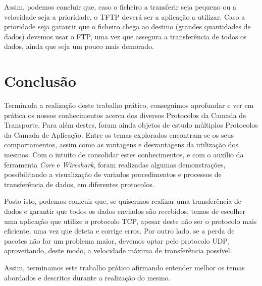 \documentclass[11pt]{article}
\begin{document}
Assim, podemos concluir que, caso o ficheiro a transferir seja pequeno ou a velocidade seja a prioridade, o TFTP deverá ser a aplicação a utilizar. Caso a prioridade seja garantir que o ficheiro chega ao destino (grandes quantidades de dados) devemos usar o FTP, uma vez que assegura a transferência de todos os dados, ainda que seja um pouco mais demorado.


\clearpage
\section{Conclusão}

Terminada a realização deste trabalho prático, conseguimos aprofundar e ver em prática os nossos conhecimentos acerca dos diversos Protocolos da Camada de Transporte. Para além destes, foram ainda objetos de estudo múltiplos Protocolos da Camada de Aplicação. Entre os temas explorados encontram-se os seus comportamentos, assim como as vantagens e desvantagens da utilização dos mesmos.
Com o intuito de consolidar estes conhecimentos, e com o auxílio da ferramenta \textit{Core} e \textit{Wireshark}, foram realizadas algumas demonstrações, possibilitando a visualização de variados procedimentos e processos de transferência de dados, em diferentes protocolos.

Posto isto, podemos conlcuir que, se quisermos realizar uma transferência de dados e garantir que todos os dados enviados são recebidos, temos de escolher uma aplicação que utilize o protocolo TCP, apesar deste não ser o protocolo mais eficiente, uma vez que deteta e corrige erros. Por outro lado, se a perda de pacotes não for um problema maior, devemos optar pelo protocolo UDP, aproveitando, deste modo, a velocidade máxima de transferência possível.

Assim, terminamos este trabalho prático afirmando entender melhor os temas abordados e descritos durante a realização do mesmo.
\end{document}
